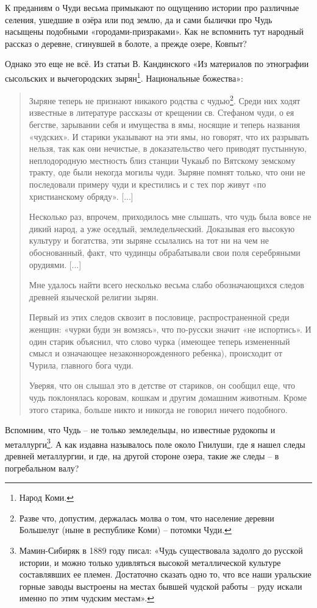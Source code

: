 К преданиям о Чуди весьма примыкают по ощущению истории про различные селения, ушедшие в озёра или под землю, да и сами былички про Чудь насыщены подобными «городами-призраками». Как не вспомнить тут народный рассказ о деревне, сгинувшей в болоте, а прежде озере, Ковпыт? 

Однако это еще не всё. Из статьи В. Кандинского «Из материалов по этнографии сысольских и вычегородских зырян\footnote{Народ Коми.}. Национальные божества»\cite{etnoboz3}:

\begin{quotation}
Зыряне теперь не признают никакого родства с чудью\footnote{Разве что, допустим, держалась молва о том, что население деревни Большелуг (ныне в республике Коми) – потомки Чуди.}. Среди них ходят известные в литературе рассказы от крещении св. Стефаном чуди, о ея бегстве, зарывании себя и имущества в ямы, носящие и теперь названия «чудских». И старики указывают на эти ямы, но говорят, что их разрывать нельзя, так как они нечистые, в доказательство чего приводят пустынную, неплодородную местность близ станции Чукаыб по Вятскому земскому тракту, оде были некогда могилы чуди. Зыряне помнят только, что они не последовали примеру чуди и крестились и с тех пор живут «по христианскому обряду». [...]

Несколько раз, впрочем, приходилось мне слышать, что чудь была вовсе не дикий народ, а уже оседлый, земледельческий. Доказывая его высокую культуру и богатства, эти зыряне ссылались на тот ни на чем не обоснованный, факт, что чудинцы обрабатывали свои поля серебряными орудиями. [...]

Мне удалось найти всего несколько весьма слабо обозначающихся следов древней языческой религии зырян.

Первый из этих следов сквозит в пословице, распространенной среди женщин: «чурки буди эн вомзясь», что по-русски значит «не испортись». И один старик объяснил, что слово чурка (имеющее теперь измененный смысл и означающее незаконнорожденного ребенка), происходит от Чурила, главного бога чуди.

Уверяя, что он слышал это в детстве от стариков, он сообщил еще, что чудь поклонялась коровам, кошкам и другим домашним животным. Кроме этого старика, больше никто и никогда не говорил ничего подобного.
\end{quotation}

Вспомним, что Чудь – не только земледельцы, но известные рудокопы и металлурги\footnote{Мамин-Сибиряк в 1889 году писал: «Чудь существовала задолго до русской истории, и можно только удивляться высокой металлической культуре составлявших ее племен. Достаточно сказать одно то, что все наши уральские горные заводы выстроены на местах бывшей чудской работы – руду искали именно по этим чудским местам».}. А как издавна называлось поле около Гнилуши, где я нашел следы древней металлургии, и где, на другой стороне озера, такие же следы – в погребальном валу? 

